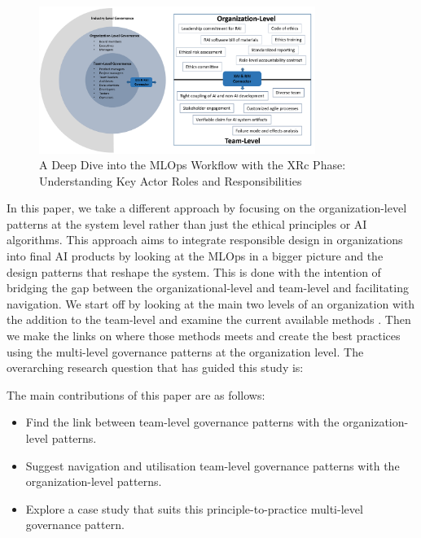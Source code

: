 \documentclass[conference]{IEEEtran}
\begin{document}
\begin{figure}[htbp!!]
	\centering
	\includegraphics[width=0.8\textwidth]{Organization.png}
	\caption{A Deep Dive into the MLOps Workflow with the XRc Phase: Understanding Key Actor Roles and Responsibilities}
	\label{XAIRAIorg}
\end{figure}
In this paper, we take a different approach by focusing on the organization-level patterns at the system level rather than just the ethical principles or AI algorithms. This approach aims to integrate responsible design in organizations into final AI products by looking at the MLOps in a bigger picture and the design patterns that reshape the system. This is done with the intention of bridging the gap between the organizational-level and team-level and facilitating navigation. We start off by looking at the main two levels of an organization with the addition to the team-level and examine the current available methods \cite{Shneiderman, ShneidermanRespo, Jana, Hussain, roadmap}. Then we make the links on where those methods meets and create the best practices using the multi-level governance patterns at the organization level. The overarching research question that has guided this study is:


\vskip 0.1in
\vskip 0.1in

\noindent{}

\vskip 0.1in
\vskip 0.1in

The main contributions of this paper are as follows:
\begin{itemize}
\item Find the link between team-level governance patterns with the organization-level patterns.
\item Suggest navigation and utilisation team-level governance patterns with the organization-level patterns.
\item Explore a case study that suits this principle-to-practice multi-level governance pattern.
\end{itemize}
\smallskip
\end{document}
